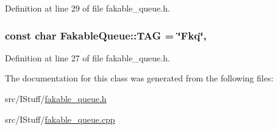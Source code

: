 Definition at line 29 of file fakable\-\_\-queue.\-h.

\hypertarget{class_i_stuff_1_1_fakable_queue_a0934f12df566975c8811084f54aa8247}{
\subsubsection[{T\-A\-G}]{\setlength{\rightskip}{0pt plus 5cm}const char Fakable\-Queue\-::\-T\-A\-G = \char`\"{}Fkq\char`\"{}\hspace{0.3cm}{\ttfamily [static]}, {\ttfamily [private]}}}\label{class_i_stuff_1_1_fakable_queue_a0934f12df566975c8811084f54aa8247}


Definition at line 27 of file fakable\-\_\-queue.\-h.



The documentation for this class was generated from the following files\-:\begin{DoxyCompactItemize}
\item 
src/\-I\-Stuff/\hyperlink{fakable__queue_8h}{fakable\-\_\-queue.\-h}\item 
src/\-I\-Stuff/\hyperlink{fakable__queue_8cpp}{fakable\-\_\-queue.\-cpp}\end{DoxyCompactItemize}
